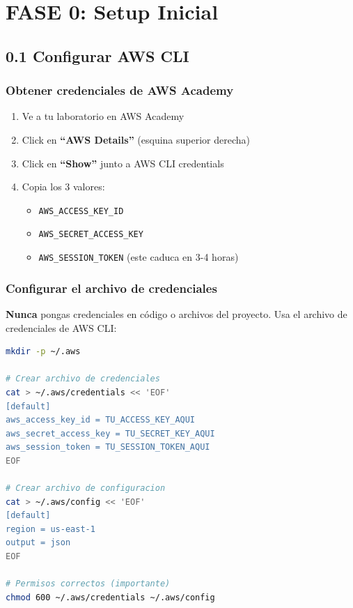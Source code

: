 \documentclass[11pt,a4paper]{article}
\begin{document}
\section{FASE 0: Setup Inicial}

\subsection{0.1 Configurar AWS CLI}

\subsubsection{Obtener credenciales de AWS Academy}

\begin{enumerate}[leftmargin=*]
    \item Ve a tu laboratorio en AWS Academy
    \item Click en \textbf{``AWS Details''} (esquina superior derecha)
    \item Click en \textbf{``Show''} junto a AWS CLI credentials
    \item Copia los 3 valores:
    \begin{itemize}
        \item \texttt{AWS\_ACCESS\_KEY\_ID}
        \item \texttt{AWS\_SECRET\_ACCESS\_KEY}
        \item \texttt{AWS\_SESSION\_TOKEN} (este caduca en 3-4 horas)
    \end{itemize}
\end{enumerate}

\subsubsection{Configurar el archivo de credenciales}

\textbf{Nunca} pongas credenciales en c\'odigo o archivos del proyecto. Usa el archivo de credenciales de AWS CLI:

\begin{lstlisting}[language=Bash, caption={Configurar AWS CLI}]
mkdir -p ~/.aws

# Crear archivo de credenciales
cat > ~/.aws/credentials << 'EOF'
[default]
aws_access_key_id = TU_ACCESS_KEY_AQUI
aws_secret_access_key = TU_SECRET_KEY_AQUI
aws_session_token = TU_SESSION_TOKEN_AQUI
EOF

# Crear archivo de configuracion
cat > ~/.aws/config << 'EOF'
[default]
region = us-east-1
output = json
EOF

# Permisos correctos (importante)
chmod 600 ~/.aws/credentials ~/.aws/config
\end{lstlisting}
\end{document}
